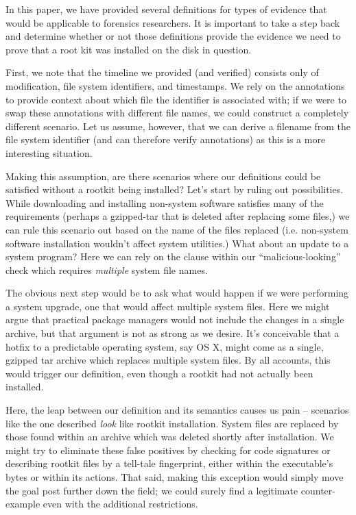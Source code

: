\documentclass[nocopyrightspace]{sigplanconf}
\begin{document}
In this paper, we have provided several definitions for types of evidence that
would be applicable to forensics researchers. It is important to take a step
back and determine whether or not those definitions provide the evidence we
need to prove that a root kit was installed on the disk in question. 

First, we note that the timeline we provided (and verified) consists only of
modification, file system identifiers, and timestamps. We rely on the
annotations to provide context about which file the identifier is associated
with; if we were to swap these annotations with different file names, we could
construct a completely different scenario. Let us assume, however, that we can
derive a filename from the file system identifier (and can therefore verify
annotations) as this is a more interesting situation.

Making this assumption, are there scenarios where our definitions could be
satisfied without a rootkit being installed? Let's start by ruling out
possibilities. While downloading and installing non-system software satisfies
many of the requirements (perhaps a gzipped-tar that is deleted after
replacing some files,) we can rule this scenario out based on the name of the
files replaced (i.e. non-system software installation wouldn't affect system
utilities.) What about an update to a system program? Here we can rely on the
clause within our ``malicious-looking'' check which requires {\em multiple}
system file names.

The obvious next step would be to ask what would happen if we were performing
a system upgrade, one that would affect multiple system files. Here we might
argue that practical package managers would not include the changes in a
single archive, but that argument is not as strong as we desire. It's
conceivable that a hotfix to a predictable operating system, say OS X, might
come as a single, gzipped tar archive which replaces multiple system files. By
all accounts, this would trigger our definition, even though a rootkit had
not actually been installed.

Here, the leap between our definition and its semantics causes us pain --
scenarios like the one described {\em look} like rootkit installation. System
files are replaced by those found within an archive which was deleted shortly
after installation. We might try to eliminate these false positives by
checking for code signatures or describing rootkit files by a tell-tale
fingerprint, either within the executable's bytes or within its actions. That
said, making this exception would simply move the goal post further down the
field; we could surely find a legitimate counter-example even with the
additional restrictions.
\end{document}
